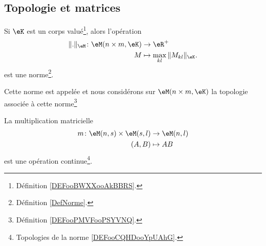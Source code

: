 \subsection{Topologie et matrices}

\begin{lemmaDef}      \label{DEFooCQHDooYpUAhG}
	Si \( \eK\) est un corps valué\footnote{Définition \ref{DEFooBWXXooAkBBRS}.}, alors l'opération
	\begin{equation}
		\begin{aligned}
			\| . \|_{\eM}\colon \eM(n\times m,\eK) & \to \eR^+                             \\
			M                                      & \mapsto  \max_{kl}\| M_{kl} \|_{\eK}.
		\end{aligned}
	\end{equation}
	est une norme\footnote{Définition \ref{DefNorme}.}.

	Cette norme est appelée  et nous considérons sur \( \eM(n\times m, \eK)\) la topologie associée à cette norme\footnote{Définition \ref{DEFooPMVFooPSYVNQ}.}
\end{lemmaDef}

\begin{proposition}     \label{PROPooOEETooPhqWuf}
	La multiplication matricielle
	\begin{equation}
		\begin{aligned}
			m\colon \eM(n,s)\times \eM(s,l) & \to \eM(n,l) \\
			(A,B)                           & \mapsto AB
		\end{aligned}
	\end{equation}
	est une opération continue\footnote{Topologies de la norme \ref{DEFooCQHDooYpUAhG}.}.
\end{proposition}

